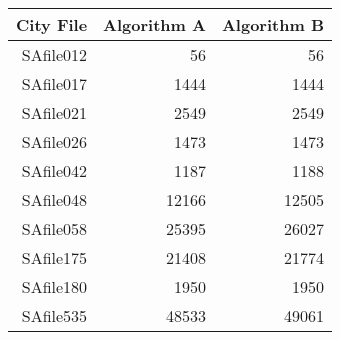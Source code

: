 \begin{tabular}{| r | r  r |}
\hline
City File & Algorithm A & Algorithm B \\
\hline
\hline
SAfile012 & 56 & 56 \\
SAfile017 & 1444 & 1444 \\
SAfile021 & 2549 & 2549 \\
SAfile026 & 1473 & 1473 \\
SAfile042 & 1187 & 1188 \\
SAfile048 & 12166 & 12505 \\
SAfile058 & 25395 & 26027 \\
SAfile175 & 21408 & 21774 \\
SAfile180 & 1950 & 1950 \\
SAfile535 & 48533 & 49061 \\
\hline
\end{tabular}
